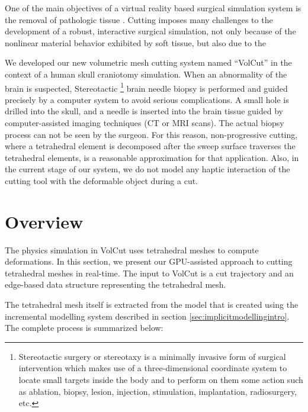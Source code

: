 \label{chapter:Cutting}
One of the main objectives of a virtual reality based surgical simulation system is the removal of pathologic tissue 
\cite{Steinemann, Nienhuys2001a}. Cutting imposes many challenges to the development of a robust, interactive surgical 
simulation, not only because of the nonlinear material behavior exhibited by soft tissue, but also due to the

We developed our new volumetric mesh cutting system named ``VolCut'' in the context of a human skull craniotomy simulation. When an abnormality of the brain is suspected, 
Stereotactic \footnote{Stereotactic surgery or stereotaxy is a minimally invasive form of surgical intervention which makes use of a three-dimensional 
coordinate system to locate small targets inside the body and to perform on them some action such as ablation, biopsy, lesion, injection, stimulation, 
implantation, radiosurgery, etc.} brain needle biopsy is performed and guided precisely by a computer system to avoid 
serious complications. A small hole is drilled into the skull, and a needle is inserted into the brain tissue guided by computer-assisted 
imaging techniques (CT or MRI scans). The actual biopsy process can not be seen by the surgeon. For this reason,
non-progressive cutting, where a tetrahedral element is decomposed after the sweep surface traverses the tetrahedral elements, is a reasonable
approximation for that application. Also, in the current stage of our system, we do not model any haptic interaction of the cutting tool with the 
deformable object during a cut. 


\section{Overview}
The physics simulation in VolCut uses tetrahedral meshes to compute deformations. In this section,
we present our GPU-assisted approach to cutting tetrahedral meshes in real-time. 
The input to VolCut is a cut trajectory and an edge-based data structure representing the tetrahedral mesh. 

The tetrahedral mesh itself is extracted from the \blob model that is created using the incremental modelling 
system described in section \ref{sec:implicitmodellingintro}. The complete process is summarized below:

